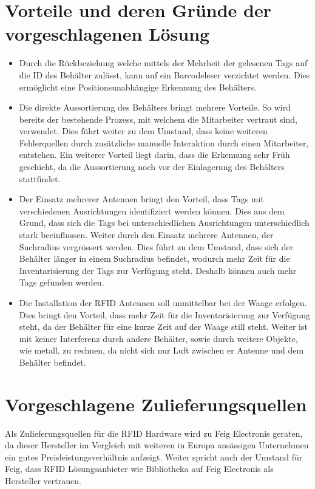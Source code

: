 \section{Vorteile und deren Gründe der vorgeschlagenen Lösung}
\begin{itemize}
	\item Durch die Rückbeziehung welche mittels der Mehrheit der gelesenen Tags auf die ID des Behälter zulässt, kann auf ein Barcodeleser verzichtet werden. Dies ermöglicht eine Positionsunabhängige Erkennung des Behälters.
	\item Die direkte Aussortierung des Behälters bringt mehrere Vorteile. So wird bereits der bestehende Prozess, mit welchem die Mitarbeiter vertraut sind, verwendet. Dies führt weiter zu dem Umstand, dass keine weiteren Fehlerquellen durch zusätzliche manuelle Interaktion durch einen Mitarbeiter, entstehen. Ein weiterer Vorteil liegt darin, dass die Erkennung sehr Früh geschieht, da die Aussortierung noch vor der Einlagerung des Behälters stattfindet.
	\item Der Einsatz mehrerer Antennen bringt den Vorteil, dass Tags mit verschiedenen Ausrichtungen identifiziert werden können. Dies aus dem Grund, dass sich die Tags bei unterschiedlichen Ausrichtungen unterschiedlich stark beeinflussen. Weiter durch den Einsatz mehrere Antennen, der Suchradius vergrössert werden. Dies führt zu dem Umstand, dass sich der Behälter länger in einem Suchradius befindet, wodurch mehr Zeit für die Inventarisierung der Tags zur Verfügung steht. Deshalb können auch mehr Tags gefunden werden.
	\item Die Installation der RFID Antennen soll unmittelbar bei der Waage erfolgen. Dies bringt den Vorteil, dass mehr Zeit für die Inventarisierung zur Verfügung steht, da der Behälter für eine kurze Zeit auf der Waage still steht. Weiter ist mit keiner Interferenz durch andere Behälter, sowie durch weitere Objekte, wie metall, zu rechnen, da nicht sich nur Luft zwischen er Antenne und dem Behälter befindet.
\end{itemize}


\section{Vorgeschlagene Zulieferungsquellen}
Als Zulieferungsquellen für die RFID Hardware wird zu Feig Electronis geraten, da dieser Hersteller im Vergleich mit weiteren in Europa ansässigen Unternehmen ein gutes Preisleistungsverhältnis aufzeigt. Weiter spricht auch der Umstand für Feig, dass RFID Lösungsanbieter wie Bibliotheka auf Feig Electronis als Hersteller vertrauen.


